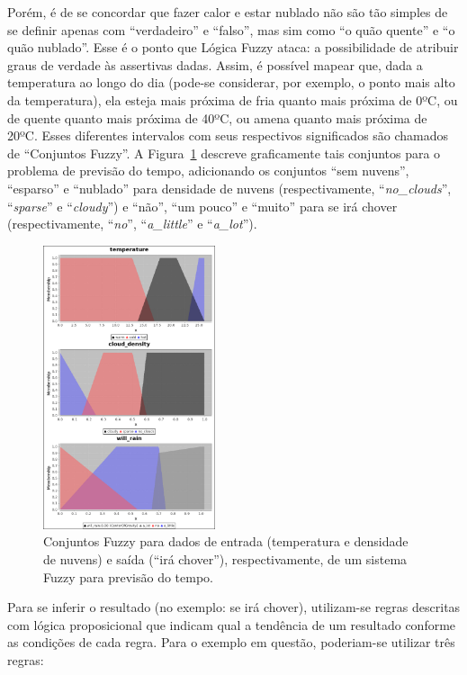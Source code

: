 \documentclass[twocolumn]{article}
\begin{document}
    Porém, é de se concordar que fazer calor e estar nublado não são tão
    simples de se definir apenas com ``verdadeiro'' e ``falso'', mas sim como
    ``o quão quente'' e ``o quão nublado''. Esse é o ponto que Lógica Fuzzy
    ataca: a possibilidade de atribuir graus de verdade às assertivas dadas.
    Assim, é possível mapear que, dada a temperatura ao longo do dia (pode-se
    considerar, por exemplo, o ponto mais alto da temperatura), ela esteja mais
    próxima de fria quanto mais próxima de 0ºC, ou de quente quanto mais
    próxima de 40ºC, ou amena quanto mais próxima de 20ºC. Esses diferentes
    intervalos com seus respectivos significados são chamados de ``Conjuntos
    Fuzzy''. A Figura~\ref{time-fuzzifiers} descreve graficamente tais
    conjuntos para o problema de previsão do tempo, adicionando os conjuntos
    ``sem nuvens'', ``esparso'' e ``nublado'' para densidade de nuvens
    (respectivamente, ``\textit{no\_clouds}'', ``\textit{sparse}'' e
    ``\textit{cloudy}'') e ``não'', ``um pouco'' e ``muito'' para se irá chover
    (respectivamente, ``\textit{no}'', ``\textit{a\_little}'' e
    ``\textit{a\_lot}'').

    \begin{figure}[h!]
        \centering
        \includegraphics[keepaspectratio,width=0.45\textwidth]{img/time-fuzzifiers}
        \caption{Conjuntos Fuzzy para dados de entrada (temperatura e densidade
        de nuvens) e saída (``irá chover''), respectivamente, de um sistema
        Fuzzy para previsão do tempo.\label{time-fuzzifiers}}
    \end{figure}

    Para se inferir o resultado (no exemplo: se irá chover), utilizam-se regras
    descritas com lógica proposicional que indicam qual a tendência de um
    resultado conforme as condições de cada regra. Para o exemplo em questão,
    poderiam-se utilizar três regras:
\end{document}

